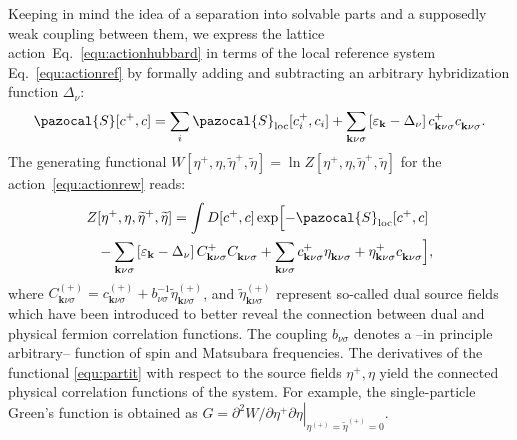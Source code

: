 \documentclass[rmp,aps,reprint,amsmath,amssymb,superscriptaddress,showpacs,nofootinbib]{revtex4-1}
\begin{document}
Keeping in mind the idea of a separation into solvable parts and a supposedly weak coupling between them, we express the lattice action~Eq.~\eqref{equ:actionhubbard} in terms of the local reference system Eq.~\eqref{equ:actionref} by formally adding and subtracting an arbitrary hybridization function $\Delta_{\nu}$:
\begin{equation}
\label{equ:actionrew}
  \pazocal{S}[c^+,c]=\sum_{i}\pazocal{S}_{\text{loc}}[c_{i}^+,c_{i}]+\sum_{\mathbf{k}\nu\sigma}\left[\varepsilon_{\mathbf{k}}-\Delta_{\nu}\right]c^+_{\mathbf{k}\nu\sigma}c^{\phantom +}_{\mathbf{k}\nu\sigma}.
\end{equation}
The generating functional $W[\eta^+,\eta,\widetilde{\eta}^+,\widetilde{\eta}]=\ln Z[\eta^+,\eta,\widetilde{\eta}^+,\widetilde{\eta}]$ for the action~\eqref{equ:actionrew} reads:
\begin{align}
\label{equ:partit}
  Z&[\eta^+,\eta,\widetilde{\eta}^+,\widetilde{\eta}]=\int D[c^+,c]\exp\Bigl[ -\pazocal{S}_{\text{loc}}[c^+,c]\\&-\sum_{\mathbf{k}\nu\sigma}\left[\varepsilon_{\mathbf{k}}-\Delta_{\nu}\right]C^+_{\mathbf{k}\nu\sigma}C^{\phantom +}_{\mathbf{k}\nu\sigma}+ \sum_{\mathbf{k}\nu\sigma}c^+_{\mathbf{k}\nu\sigma}\eta^{\phantom +}_{\mathbf{k}\nu\sigma}+\eta^+_{\mathbf{k}\nu\sigma}c^{\phantom +}_{\mathbf{k}\nu\sigma}\Bigr],\notag
\end{align}
where $C^{(+)}_{\mathbf{k}\nu\sigma}=c^{(+)}_{\mathbf{k}\nu\sigma}+b^{-1}_{\nu\sigma}\widetilde{\eta}^{(+)}_{\mathbf{k}\nu\sigma}$, and $\widetilde{\eta}^{(+)}_{\mathbf{k}\nu\sigma}$ represent so-called dual source fields which have been introduced to better reveal the connection between dual and physical fermion correlation functions. The coupling $b_{\nu\sigma}$  denotes a --in principle arbitrary-- function of spin and Matsubara frequencies. The derivatives of the functional \eqref{equ:partit} with respect to the source fields $\eta^{+},\eta$ yield the connected physical correlation functions of the system. For example, the single-particle Green's function is obtained as $G=\left.\partial^{2}W/\partial\eta^{+}\partial\eta\right|_{\eta^{(+)}=\widetilde{\eta}^{(+)}=0}$.
\end{document}

